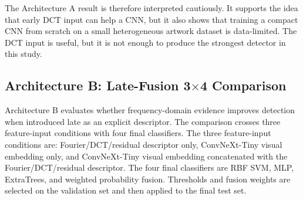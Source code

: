 ﻿\documentclass[10pt,twocolumn]{article}
\begin{document}
The Architecture A result is therefore interpreted cautiously. It supports the idea that early DCT input can help a CNN, but it also shows that training a compact CNN from scratch on a small heterogeneous artwork dataset is data-limited. The DCT input is useful, but it is not enough to produce the strongest detector in this study.

\subsection{Architecture B: Late-Fusion 3\(\times\)4 Comparison}
Architecture B evaluates whether frequency-domain evidence improves detection when introduced late as an explicit descriptor. The comparison crosses three feature-input conditions with four final classifiers. The three feature-input conditions are: Fourier/DCT/residual descriptor only, ConvNeXt-Tiny visual embedding only, and ConvNeXt-Tiny visual embedding concatenated with the Fourier/DCT/residual descriptor. The four final classifiers are RBF SVM, MLP, ExtraTrees, and weighted probability fusion. Thresholds and fusion weights are selected on the validation set and then applied to the final test set.
\end{document}
